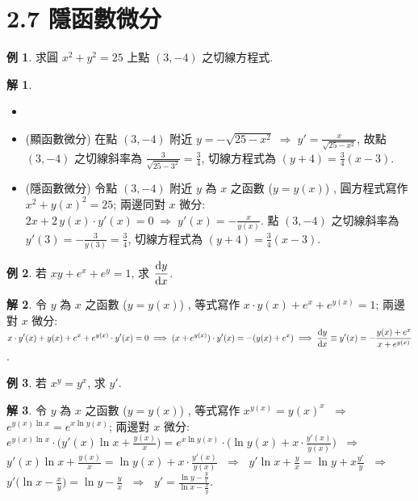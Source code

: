 \documentclass[12pt]{extarticle}
\newcommand{\ds}{\displaystyle}
\newcommand{\ie}{\;\Longrightarrow\;}
\newcommand{\diff}[2]{ \frac{\mathrm{d}\hfil#1\hfil}{\mathrm{d}#2}}
\theoremstyle{definition}
\newtheorem*{ex}{例}
\newtheorem*{sol}{解}
\begin{document}
\section*{2.7 隱函數微分}

\begin{ex}
  求圓 $x^2 + y^2 = 25$ 上點 $(3, -4)$ 之切線方程式. 
\end{ex}

\begin{sol}
  \begin{itemize}\setlength\itemsep{0em}
    \item[]
    \item (顯函數微分) 在點 $(3, -4)$ 附近 $\ds y = -\sqrt{25 - x^2}\ie y' = \frac{x}{\sqrt{25 - x^2}}$, 故點 $(3, -4)$ 之切線斜率為 $\ds\frac{3}{\sqrt{25 - 3^2}} = \frac{3}{4}$, 切線方程式為 $\ds(y + 4) = \frac{3}{4}(x - 3)$.  
    \item (隱函數微分) 令點 $(3, -4)$ 附近 $y$ 為 $x$ 之函數 ($y = y(x)$) , 圓方程式寫作 $\ds x^2 + y(x)^2 = 25$; 兩邊同對 $x$ 微分: $\ds 2x + 2\,y(x)\cdot y'(x) = 0 \ie y'(x) = -\frac{x}{y(x)}$. 點 $(3, -4)$ 之切線斜率為 $\ds y'(3) = -\frac{3}{y(3)} = \frac{3}{4}$, 切線方程式為 $\ds(y + 4) = \frac{3}{4}(x - 3)$. 
  \end{itemize}
\end{sol}

\begin{ex}
  若 $\ds xy + e^x + e^y = 1$, 求 $\ds\diff{y}{x}$.     
\end{ex}

\begin{sol}
  令 $y$ 為 $x$ 之函數 ($y = y(x)$) , 等式寫作 $\ds x\cdot y(x) + e^x + e^{y(x)} = 1$; 兩邊對 $x$ 微分: $\ds x\cdot y'(x) + y(x) + e^x + e^{y(x)}\cdot y'(x) = 0 \ie (x + e^{y(x)})\cdot y'(x) = -(y(x) + e^x) \ie \diff{y}{x} \equiv y'(x) = -\frac{y(x) + e^x}{x + e^{y(x)}}$. 
\end{sol}

\begin{ex}
  若 $\ds x^y = y^x$, 求 $y'$.     
\end{ex}

\begin{sol}
  令 $y$ 為 $x$ 之函數 ($y = y(x)$) , 等式寫作 $\ds x^{y(x)} = {y(x)}^x$ $\ie$ $\ds e^{y(x)\ln x} = e^{x\ln y(x)}$; 兩邊對 $x$ 微分: $\ds e^{y(x)\ln x}\cdot\Big(y'(x)\ln x + \frac{y(x)}{x}\Big) = e^{x\ln y(x)}\cdot\Big(\ln y(x) + x\cdot\frac{y'(x)}{y(x)}\Big)$ $\ie$ $\ds y'(x)\ln x + \frac{y(x)}{x} = \ln y(x) + x\cdot\frac{y'(x)}{y(x)}$ $\ie$ $\ds y'\ln x + \frac{y}{x} = \ln y + x\frac{y'}{y}$ $\ie$ $\ds y'\Big(\ln x - \frac{x}{y}\Big) = \ln y - \frac{y}{x}$ $\ie$ $\ds y' = \frac{\ln y - \frac{y}{x}}{\ln x - \frac{x}{y}}$. 
\end{sol}
\end{document}
